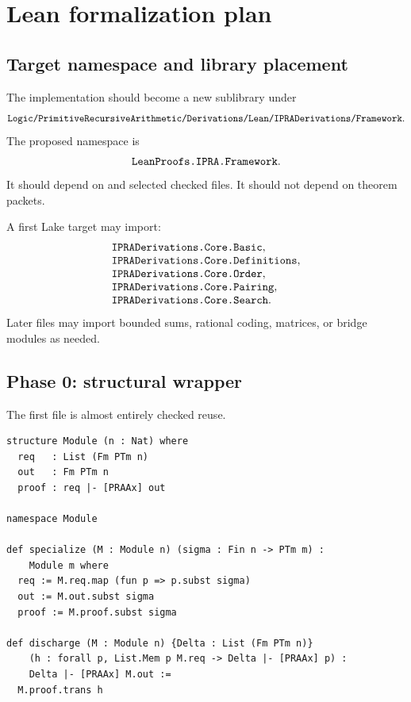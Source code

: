 
\section{Lean formalization plan}
\label{sec:lean}

\subsection{Target namespace and library placement}

The implementation should become a new sublibrary under
\[
 \code{Logic/PrimitiveRecursiveArithmetic/Derivations/Lean/IPRADerivations/Framework}.
\]
The proposed namespace is
\[
       \code{LeanProofs.IPRA.Framework}.
\]
It should depend on  and selected checked
 files.  It should not depend on theorem packets.

A first Lake target may import:
\[
\begin{array}{l}
\code{IPRADerivations.Core.Basic},\\
\code{IPRADerivations.Core.Definitions},\\
\code{IPRADerivations.Core.Order},\\
\code{IPRADerivations.Core.Pairing},\\
\code{IPRADerivations.Core.Search}.
\end{array}
\]
Later files may import bounded sums, rational coding, matrices, or bridge
modules as needed.

\subsection{Phase 0: structural wrapper}

The first file is almost entirely checked reuse.

\begin{lstlisting}[language={}]
structure Module (n : Nat) where
  req   : List (Fm PTm n)
  out   : Fm PTm n
  proof : req |- [PRAAx] out

namespace Module

def specialize (M : Module n) (sigma : Fin n -> PTm m) :
    Module m where
  req := M.req.map (fun p => p.subst sigma)
  out := M.out.subst sigma
  proof := M.proof.subst sigma

def discharge (M : Module n) {Delta : List (Fm PTm n)}
    (h : forall p, List.Mem p M.req -> Delta |- [PRAAx] p) :
    Delta |- [PRAAx] M.out :=
  M.proof.trans h
\end{lstlisting}

